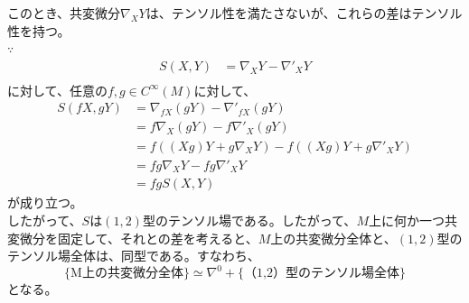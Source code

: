 \documentclass[a4paper,11pt]{jsarticle}
\numberwithin{equation}{section}
\begin{document}
このとき、共変微分$\nabla_XY$は、テンソル性を満たさないが、これらの差はテンソル性を持つ。\\
$\because$\\
\begin{align}
    S(X,Y) &= \nabla_XY - \nabla'_{X}Y\\
\end{align}
に対して、任意の$f,g \in C^\infty(M)$に対して、
\begin{align}
    S(fX,gY) &= \nabla_{fX}(gY) - \nabla'_{fX}(gY)\\
    &= f\nabla_X(gY) - f\nabla'_{X}(gY)\\
    &= f((Xg)Y + g\nabla_XY) - f((Xg)Y + g\nabla'_{X}Y)\\
    &= fg\nabla_XY - fg\nabla'_{X}Y\\
    &= fgS(X,Y)
\end{align}
が成り立つ。\hfill\qedsymbol\\
したがって、$S$は$(1,2)$型のテンソル場である。したがって、$M$上に何か一つ共変微分を固定して、それとの差を考えると、$M$上の共変微分全体と、$(1,2)$型のテンソル場全体は、同型である。すなわち、
\begin{equation}
 \{\text{M上の共変微分全体}\} \simeq \nabla^{0} +\{\text{（1,2）型のテンソル場全体}\}
\end{equation}
となる。\\
\end{document}
